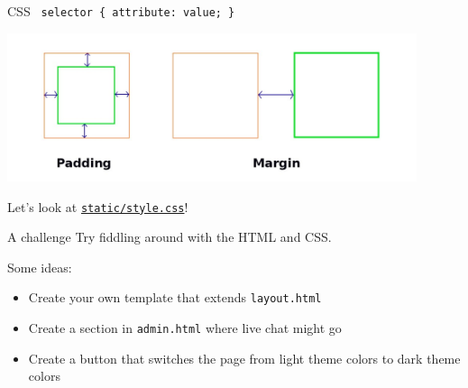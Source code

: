 \documentclass{beamer}
\begin{document}
\begin{frame}{CSS}
	\texttt{
		selector \{
			attribute: value;
		\}
	}

	\pause

	\bigskip

	\begin{center}
		\includegraphics[width=0.9\textwidth]{figs/margin-padding.jpeg}	
	\end{center}

	\pause

	\bigskip

	Let's look at \href{https://github.com/ADC-UMN/multiplayer-trivia-game/blob/master/src/static/style.css}{\texttt{static/style.css}}!
\end{frame}

\begin{frame}{A challenge}
	Try fiddling around with the HTML and CSS.

	\pause

	\bigskip

	Some ideas:
	\begin{itemize}
		\item Create your own template that extends \texttt{layout.html} \pause
		\item Create a section in \texttt{admin.html} where live chat might go \pause
		\item Create a button that switches the page from light theme colors to dark theme colors
	\end{itemize}
\end{frame}
\end{document}
